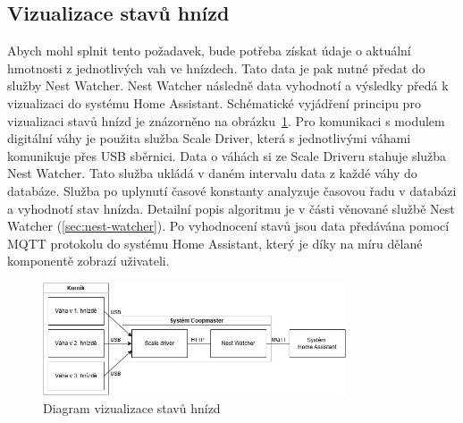 \subsection{Vizualizace stavů hnízd}
Abych mohl splnit tento požadavek, bude potřeba získat údaje o aktuální hmotnosti z jednotlivých vah ve hnízdech.
Tato data je pak nutné předat do služby Nest Watcher.
Nest Watcher následně data vyhodnotí a výsledky předá k vizualizaci do systému Home Assistant.
Schématické vyjádření principu pro vizualizaci stavů hnízd je znázorněno na obrázku~\ref{fig:vizualizace_stavu_hnizd}. \newline
Pro komunikaci s modulem digitální váhy je použita služba Scale Driver, která s jednotlivými váhami komunikuje přes USB sběrnici.
Data o váhách si ze Scale Driveru stahuje služba Nest Watcher.
Tato služba ukládá v daném intervalu data z každé váhy do databáze.
Služba po uplynutí časové konstanty analyzuje časovou řadu v databázi a vyhodnotí stav hnízda.
Detailní popis algoritmu je v části věnované službě Nest Watcher (\ref{sec:nest-watcher}).
Po vyhodnocení stavů jsou data předávána pomocí MQTT protokolu do systému Home Assistant, který je díky na míru dělané komponentě zobrazí uživateli.
\begin{figure}[h]
    \centering
    \includegraphics[width=0.8\textwidth]{img/vizualizace_stavu_hnizd}
    \caption{Diagram vizualizace stavů hnízd}
    \label{fig:vizualizace_stavu_hnizd}
\end{figure}

\clearpage

